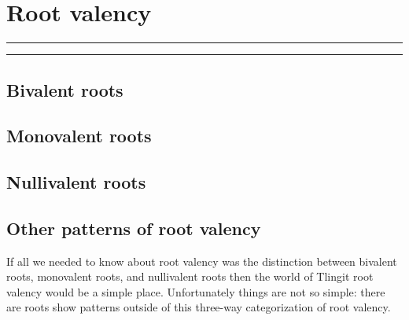 
\resetexcnt
\chapter{Root valency}\label{ch:rootval}

\startcontents[chapters]
\noindent\rule[0.5em]{\textwidth}{\heavyrulewidth}
\noindent\rule{\textwidth}{\heavyrulewidth}
\vspace{1\baselineskip}


\section{Bivalent roots}\label{sec:rootval-bi}

\section{Monovalent roots}\label{sec:rootval-mono}

\section{Nullivalent roots}\label{sec:rootval-null}

\section{Other patterns of root valency}\label{sec:rootval-other}

If all we needed to know about root valency was the distinction between bivalent roots, monovalent roots, and nullivalent roots then the world of Tlingit root valency would be a simple place.
Unfortunately things are not so simple: there are roots show patterns outside of this three-way categorization of root valency.

\stopcontents[chapters]